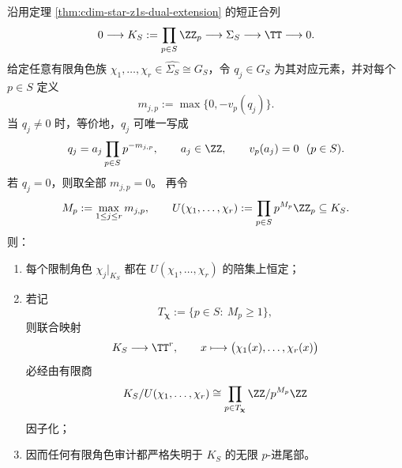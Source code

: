 \begin{theorem}\label{thm:xi-time-part69-finite-character-prime-ledger-finite-depth}
沿用定理 \ref{thm:cdim-star-z1s-dual-extension} 的短正合列
\[
0\longrightarrow K_S:=\prod_{p\in S}\ZZ_p
\longrightarrow \Sigma_S
\longrightarrow \TT
\longrightarrow 0.
\]
给定任意有限角色族 \(\chi_1,\dots,\chi_r\in \widehat{\Sigma_S}\cong G_S\)，令 \(q_j\in G_S\) 为其对应元素，并对每个 \(p\in S\) 定义
\[
m_{j,p}:=\max\{0,-v_p(q_j)\}.
\]
当 \(q_j\neq 0\) 时，等价地，\(q_j\) 可唯一写成
\[
q_j=a_j\prod_{p\in S}p^{-m_{j,p}},
\qquad
a_j\in\ZZ,
\qquad
v_p(a_j)=0\ \ (p\in S).
\]
若 \(q_j=0\)，则取全部 \(m_{j,p}=0\)。
再令
\[
M_p:=\max_{1\le j\le r}m_{j,p},
\qquad
U(\chi_1,\dots,\chi_r):=\prod_{p\in S}p^{M_p}\ZZ_p\subseteq K_S.
\]
则：
\begin{enumerate}
  \item 每个限制角色 \(\chi_j|_{K_S}\) 都在 \(U(\chi_1,\dots,\chi_r)\) 的陪集上恒定；
  \item 若记
  \[
  T_{\boldsymbol{\chi}}:=\{p\in S:\ M_p\ge 1\},
  \]
  则联合映射
  \[
  K_S\longrightarrow \TT^r,
  \qquad
  x\longmapsto \bigl(\chi_1(x),\dots,\chi_r(x)\bigr)
  \]
  必经由有限商
  \[
  K_S/U(\chi_1,\dots,\chi_r)
  \cong
  \prod_{p\in T_{\boldsymbol{\chi}}}\ZZ/p^{M_p}\ZZ
  \]
  因子化；
  \item 因而任何有限角色审计都严格失明于 \(K_S\) 的无限 \(p\)-进尾部。
\end{enumerate}
\end{theorem}
